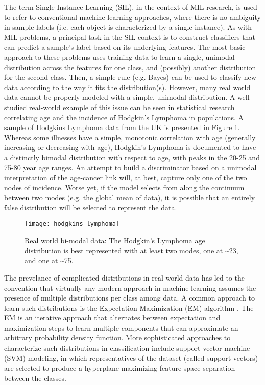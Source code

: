 \documentclass[12pt,dvips]{report}
\numberwithin{equation}{section}
\begin{document}
The term Single Instance Learning (SIL), in the context of MIL research,
is used to refer to conventional machine learning approaches, where
there is no ambiguity in sample labels (i.e. each object is characterized
by a single instance). As with MIL problems, a principal task in the
SIL context is to construct classifiers that can predict a sample's
label based on its underlying features. The most basic approach to
these problems uses training data to learn a single,
unimodal distribution across the features for one class, and (possibly)
another distribution for the second class.  Then, a simple rule (e.g. Bayes) can be used to classify new data according to the way it fits the distribution(s). However, many real world data cannot be properly modeled with a simple, unimodal distribution. A well studied
real-world example of this issue can be seen in statistical research
correlating age and the incidence of Hodgkin's Lymphoma in populations.
A sample of Hodgkins Lymphoma data from the UK is presented in Figure
\ref{fig:hodgkins lymphoma}. Whereas some illnesses have a simple,
monotonic correlation with age (generally increasing or decreasing
with age), Hodgkin's Lymphoma is documented to have a distinctly bimodal
distribution with respect to age, with peaks in the 20-25 and 75-80
year age ranges. An attempt to build a discriminator based on a unimodal
interpretation of the age-cancer link will, at best, capture only
one of the two nodes of incidence. Worse yet, if the model selects
from along the continuum between two modes (e.g. the global mean of
data), it is possible that an entirely false distribution will be
selected to represent the data. 

\begin{figure}
\texttt{[image: hodgkins\_lymphoma]}

\caption{Real world bi-modal data: The Hodgkin's Lymphoma age distribution
is best represented with at least two modes, one at \textasciitilde{}23,
and one at \textasciitilde{}75.\label{fig:hodgkins lymphoma} }
\end{figure}


The prevelance of complicated distributions in real world data has
led to the convention that virtually any modern approach in machine
learning assumes the presence of multiple distributions per class
among data. A common approach to learn such distributions is the Expectation
Maximization (EM) algorithm \cite{Dempster1977}.  The EM is an iterative approach that alternates between 
expectation and maximization steps to learn multiple components
that can approximate an arbitrary probability density function. More
sophisticated approaches to characterize such distributions in classification
include support vector machine (SVM) \cite{CorinnaCortes1995} modeling,
in which representatives of the dataset (called support vectors) are selected
to produce a hyperplane maximizing feature space separation between
the classes.
\end{document}
